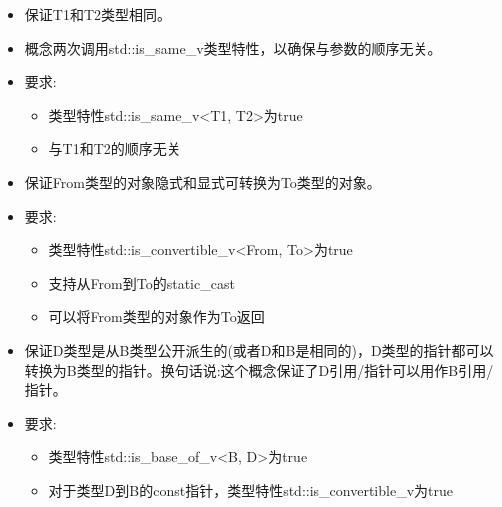 

\begin{itemize}
\item
保证T1和T2类型相同。

\item
概念两次调用std::is\_same\_v类型特性，以确保与参数的顺序无关。

\item
要求:
\begin{itemize}
\item
类型特性std::is\_same\_v<T1, T2>为true

\item
与T1和T2的顺序无关
\end{itemize}
\end{itemize}


\begin{itemize}
\item
保证From类型的对象隐式和显式可转换为To类型的对象。

\item
要求:
\begin{itemize}
\item
类型特性std::is\_convertible\_v<From, To>为true

\item
支持从From到To的static\_cast

\item
可以将From类型的对象作为To返回
\end{itemize}
\end{itemize}


\begin{itemize}
\item
保证D类型是从B类型公开派生的(或者D和B是相同的)，D类型的指针都可以转换为B类型的指针。换句话说:这个概念保证了D引用/指针可以用作B引用/指针。

\item
要求:
\begin{itemize}
\item
类型特性std::is\_base\_of\_v<B, D>为true

\item
对于类型D到B的const指针，类型特性std::is\_convertible\_v为true
\end{itemize}
\end{itemize}

